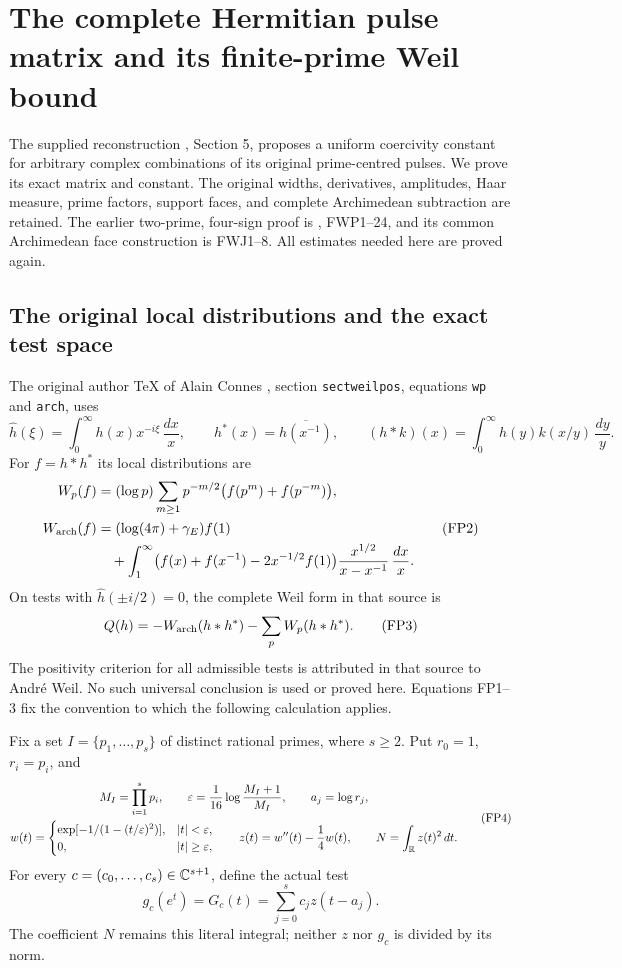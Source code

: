 \section{The complete Hermitian pulse matrix and its finite-prime Weil bound}


The supplied reconstruction \cite{FullSupportIntake}, Section 5, proposes a
uniform coercivity constant for arbitrary complex combinations of
its original prime-centred pulses. We prove its exact matrix and
constant. The original widths, derivatives, amplitudes, Haar measure,
prime factors, support faces, and complete Archimedean subtraction
are retained. The earlier two-prime, four-sign proof is
\cite{Edition033}, FWP1--24, and its common Archimedean face construction
is FWJ1--8. All estimates needed here are proved again.

\subsection{The original local distributions and the exact test space}

The original author TeX of Alain Connes \cite{Connes2026}, section
\texttt{sectweilpos}, equations \texttt{wp} and \texttt{arch}, uses
\[
 \widehat h(\xi)=\int_0^\infty h(x)x^{-i\xi}\,\frac{dx}{x},
 \qquad h^*(x)=\overline{h(x^{-1})},\qquad
 (h*k)(x)=\int_0^\infty h(y)k(x/y)\,\frac{dy}{y}.
 \tag{FP1}\label{fp:fpb:conventions}
\]
For \(f=h*h^*\) its local distributions are
\[
 \begin{aligned}
 W_p(f)&=(\log p)\sum_{m\ge1}p^{-m/2}
                              \bigl(f(p^m)+f(p^{-m})\bigr),\\
 W_{\rm arch}(f)&=(\log(4\pi)+\gamma_E)f(1)\\
 &\quad+\int_1^\infty
 \bigl(f(x)+f(x^{-1})-2x^{-1/2}f(1)\bigr)
                    \frac{x^{1/2}}{x-x^{-1}}\,\frac{dx}{x}.
 \end{aligned}
 \tag{FP2}\label{fp:fpb:local}
\]
On tests with \(\widehat h(\pm i/2)=0\), the complete Weil form
in that source is
\[
 Q(h)=-W_{\rm arch}(h*h^*)-\sum_pW_p(h*h^*).
 \tag{FP3}
\]
The positivity criterion for all admissible tests is attributed
in that source to Andr\'e Weil. No such universal conclusion is
used or proved here. Equations FP1--3 fix the convention to which
the following calculation applies.

Fix a set \(I=\{p_1,\ldots,p_s\}\) of distinct rational primes,
where \(s\ge2\). Put \(r_0=1\), \(r_i=p_i\), and
\[
 \begin{gathered}
 M_I=\prod_{i=1}^s p_i,\qquad
 \varepsilon=\frac1{16}\log\frac{M_I+1}{M_I},\qquad a_j=\log r_j,\\
 w(t)=
 \begin{cases}
 \exp[-1/(1-(t/\varepsilon)^2)],& |t|<\varepsilon,\\
 0,& |t|\ge\varepsilon,
 \end{cases}
 \qquad z(t)=w''(t)-\frac14w(t),\qquad
 N=\int_{\mathbb R}z(t)^2\,dt .
 \end{gathered}
 \tag{FP4}\label{fp:fpb:pulse}
\]
For every \(c=(c_0,\ldots,c_s)\in\mathbb C^{s+1}\), define the actual test
\[
 g_c(e^t)=G_c(t)=\sum_{j=0}^s c_jz(t-a_j).
 \tag{FP5}\label{fp:fpb:test}
\]
The coefficient \(N\) remains this literal integral; neither \(z\)
nor \(g_c\) is divided by its norm.

